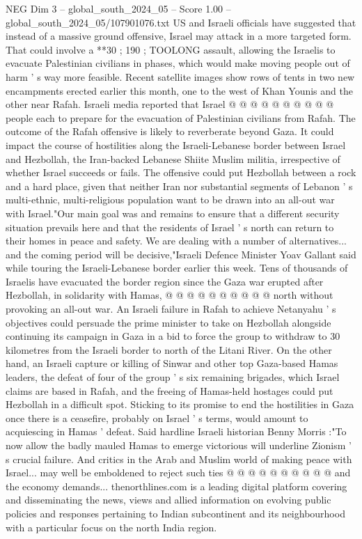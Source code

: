 \begin{textsample}{NEG Dim 3 – global\_south\_2024\_05 – Score 1.00 – global\_south\_2024\_05/107901076.txt}
US and Israeli officials have suggested that instead of a massive ground offensive, Israel may attack in a more targeted form.
That could involve a **30 ; 190 ; TOOLONG assault, allowing the Israelis to evacuate Palestinian civilians in phases, which would make moving people out of harm ' s way more feasible.
Recent satellite images show rows of tents in two new encampments erected earlier this month, one to the west of Khan Younis and the other near Rafah.
Israeli media reported that Israel @ @ @ @ @ @ @ @ @ @ people each to prepare for the evacuation of Palestinian civilians from Rafah.
The outcome of the Rafah offensive is likely to reverberate beyond Gaza.
It could impact the course of hostilities along the Israeli-Lebanese border between Israel and Hezbollah, the Iran-backed Lebanese Shiite Muslim militia, irrespective of whether Israel succeeds or fails.
The offensive could put Hezbollah between a rock and a hard place, given that neither Iran nor substantial segments of Lebanon ' s multi-ethnic, multi-religious population want to be drawn into an all-out war with Israel."Our main goal was and remains to ensure that a different security situation prevails here and that the residents of Israel ' s north can return to their homes in peace and safety.
We are dealing with a number of alternatives... and the coming period will be decisive,"Israeli Defence Minister Yoav Gallant said while touring the Israeli-Lebanese border earlier this week.
Tens of thousands of Israelis have evacuated the border region since the Gaza war erupted after Hezbollah, in solidarity with Hamas, @ @ @ @ @ @ @ @ @ @ north without provoking an all-out war.
An Israeli failure in Rafah to achieve Netanyahu ' s objectives could persuade the prime minister to take on Hezbollah alongside continuing its campaign in Gaza in a bid to force the group to withdraw to 30 kilometres from the Israeli border to north of the Litani River.
On the other hand, an Israeli capture or killing of Sinwar and other top Gaza-based Hamas leaders, the defeat of four of the group ' s six remaining brigades, which Israel claims are based in Rafah, and the freeing of Hamas-held hostages could put Hezbollah in a difficult spot.
Sticking to its promise to end the hostilities in Gaza once there is a ceasefire, probably on Israel ' s terms, would amount to acquiescing in Hamas ' defeat.
Said hardline Israeli historian Benny Morris :"To now allow the badly mauled Hamas to emerge victorious will underline Zionism ' s crucial failure.
And critics in the Arab and Muslim world of making peace with Israel... may well be emboldened to reject such ties @ @ @ @ @ @ @ @ @ @ and the economy demands... thenorthlines.com is a leading digital platform covering and disseminating the news, views and allied information on evolving public policies and responses pertaining to Indian subcontinent and its neighbourhood with a particular focus on the north India region.

\end{textsample}
